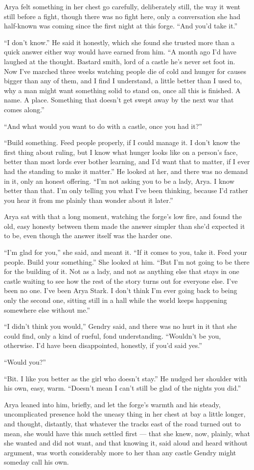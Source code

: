 Arya felt something in her chest go carefully, deliberately still, the way it went still before a fight, though there was no fight here, only a conversation she had half-known was coming since the first night at this forge. “And you’d take it.”

“I don’t know.” He said it honestly, which she found she trusted more than a quick answer either way would have earned from him. “A month ago I’d have laughed at the thought. Bastard smith, lord of a castle he’s never set foot in. Now I’ve marched three weeks watching people die of cold and hunger for causes bigger than any of them, and I find I understand, a little better than I used to, why a man might want something solid to stand on, once all this is finished. A name. A place. Something that doesn’t get swept away by the next war that comes along.”

“And what would you want to do with a castle, once you had it?”

“Build something. Feed people properly, if I could manage it. I don’t know the first thing about ruling, but I know what hunger looks like on a person’s face, better than most lords ever bother learning, and I’d want that to matter, if I ever had the standing to make it matter.” He looked at her, and there was no demand in it, only an honest offering. “I’m not asking you to be a lady, Arya. I know better than that. I’m only telling you what I’ve been thinking, because I’d rather you hear it from me plainly than wonder about it later.”

Arya sat with that a long moment, watching the forge’s low fire, and found the old, easy honesty between them made the answer simpler than she’d expected it to be, even though the answer itself was the harder one.

“I’m glad for you,” she said, and meant it. “If it comes to you, take it. Feed your people. Build your something.” She looked at him. “But I’m not going to be there for the building of it. Not as a lady, and not as anything else that stays in one castle waiting to see how the rest of the story turns out for everyone else. I’ve been no one. I’ve been Arya Stark. I don’t think I’m ever going back to being only the second one, sitting still in a hall while the world keeps happening somewhere else without me.”

“I didn’t think you would,” Gendry said, and there was no hurt in it that she could find, only a kind of rueful, fond understanding. “Wouldn’t be you, otherwise. I’d have been disappointed, honestly, if you’d said yes.”

“Would you?”

“Bit. I like you better as the girl who doesn’t stay.” He nudged her shoulder with his own, easy, warm. “Doesn’t mean I can’t still be glad of the nights you did.”

Arya leaned into him, briefly, and let the forge’s warmth and his steady, uncomplicated presence hold the uneasy thing in her chest at bay a little longer, and thought, distantly, that whatever the tracks east of the road turned out to mean, she would have this much settled first — that she knew, now, plainly, what she wanted and did not want, and that knowing it, said aloud and heard without argument, was worth considerably more to her than any castle Gendry might someday call his own.
